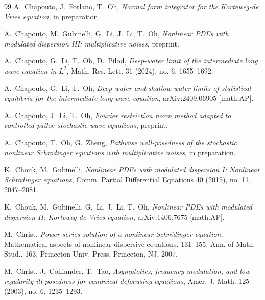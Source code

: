 \documentclass[letterpaper, 11pt,  reqno]{amsart}
\newcommand{\1}{\hspace{0.5mm}\text{I}\hspace{0.5mm}}
\numberwithin{equation}{section}
\numberwithin{theorem}{section}
\begin{document}
\begin{thebibliography}{99}
A.~Chapouto, J.~Forlano, T.~Oh, 
{\it  Normal form integrator for the Korteweg-de Vries equation},
in preparation.


A.~Chapouto, M.~Gubinelli, G.~Li, J.~Li, T.~Oh, 
{\it Nonlinear PDEs with modulated dispersion III: multiplicative noises}, 
preprint.


A.~Chapouto, G.~Li, T.~Oh, D.~Pilod,
{\it Deep-water limit of the intermediate long wave equation in $L^2$},
Math. Res. Lett.
 31 (2024), no. 6, 1655--1692. 



A.~Chapouto, G.~Li, T.~Oh, 
{\it
Deep-water and shallow-water limits
of statistical equilibria
for the intermediate long wave equation}, 
arXiv:2409.06905 [math.AP].




A.~Chapouto, J.~Li, T.~Oh, 
{\it  Fourier restriction norm method adapted to controlled paths:
stochastic wave equations},
preprint.






A.~Chapouto, T.~Oh, G.~Zheng,
{\it  Pathwise well-posedness of the stochastic nonlinear Schr\"odinger equations with multiplicative noises},
in preparation.


%



K.~Chouk, M.~Gubinelli, 
{\it Nonlinear PDEs with modulated dispersion I: Nonlinear Schr\"odinger equations},
Comm. Partial Differential Equations 40 (2015), no. 11, 2047--2081. 





K.~Chouk, M.~Gubinelli, G.~Li, J.~Li, T.~Oh, 
{\it Nonlinear PDEs with modulated dispersion II: Korteweg-de Vries equation}, 
arXiv:1406.7675 [math.AP].




M.~Christ, 
{\it Power series solution of a nonlinear Schr\"odinger equation}, Mathematical aspects of nonlinear dispersive equations, 131--155, Ann. of Math. Stud., 163, Princeton Univ. Press, Princeton, NJ, 2007.



M.~Christ, J.~Colliander, T.~Tao,
{\it Asymptotics, frequency modulation, and low regularity ill-posedness for canonical defocusing equations},
Amer. J. Math. 125 (2003), no. 6, 1235--1293.






\end{thebibliography}
\end{document}
